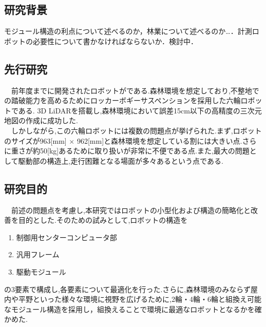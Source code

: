 \subsection{研究背景}
モジュール構造の利点について述べるのか，林業について述べるのか…．計測ロボットの必要性について書かなければならないか．検討中．

\subsection{先行研究}
\ \ 前年度までに開発されたロボットが\label{six_rober}である.森林環境を想定しており,不整地での踏破能力を高めるためにロッカーボギーサスペンションを採用した六輪ロボットである.
3D LiDARを搭載し,森林環境において誤差15cm以下の高精度の三次元地図の作成に成功した.\cite{arita}\\
\ \ しかしながら,この六輪ロボットには複数の問題点が挙げられた.まず,ロボットのサイズが963[mm] $\times$ 962[mm]と森林環境を想定している割には大きい点.さらに重さが約50[kg]あるために取り扱いが非常に不便である点.また,最大の問題として駆動部の構造上,走行困難となる場面が多々あるという点である.\label{problem}

\subsection{研究目的}
\ \ 前述の問題点を考慮し,本研究ではロボットの小型化および構造の簡略化と改善を目的とした.そのための試みとして,ロボットの構造を
\begin{enumerate}
	\item 制御用センターコンピュータ部
	\item 汎用フレーム
	\item 駆動モジュール
\end{enumerate}
の3要素で構成し,各要素について最適化を行った.さらに,森林環境のみならず屋内や平野といった様々な環境に視野を広げるために,2輪・4輪・6輪と組換え可能なモジュール構造を採用し，組換えることで環境に最適なロボットとなるかを確かめた.